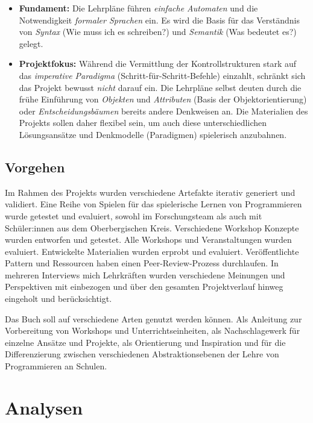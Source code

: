 \documentclass[a5paper,pagesize,10pt,bibtotoc,pointlessnumbers,
normalheadings,DIV=9,twoside=false]{scrbook}
\begin{document}
\begin{itemize}
    \item \textbf{Fundament:} Die Lehrpläne führen \textit{einfache Automaten} und die Notwendigkeit \textit{formaler Sprachen} ein. Es wird die Basis für das Verständnis von \textit{Syntax} (Wie muss ich es schreiben?) und \textit{Semantik} (Was bedeutet es?) gelegt.
    \item \textbf{Projektfokus:} Während die Vermittlung der Kontrollstrukturen stark auf das \textit{imperative Paradigma} (Schritt-für-Schritt-Befehle) einzahlt, schränkt sich das Projekt bewusst \textit{nicht} darauf ein. Die Lehrpläne selbst deuten durch die frühe Einführung von \textit{Objekten} und \textit{Attributen} (Basis der Objektorientierung) oder \textit{Entscheidungsbäumen} bereits andere Denkweisen an. Die Materialien des Projekts sollen daher flexibel sein, um auch diese unterschiedlichen Lösungsansätze und Denkmodelle (Paradigmen) spielerisch anzubahnen.
\end{itemize}

\section*{Vorgehen}

Im Rahmen des Projekts wurden verschiedene Artefakte iterativ generiert und validiert. Eine Reihe von Spielen für das spielerische Lernen von Programmieren wurde getestet und evaluiert, sowohl im Forschungsteam als auch mit Schüler:innen aus dem Oberbergischen Kreis. Verschiedene Workshop Konzepte wurden entworfen und getestet. Alle Workshops und Veranstaltungen wurden evaluiert. Entwickelte Materialien wurden erprobt und evaluiert. Veröffentlichte Pattern und Ressourcen haben einen Peer-Review-Prozess durchlaufen. In mehreren Interviews mich Lehrkräften wurden verschiedene Meinungen und Perspektiven mit einbezogen und über den gesamten Projektverlauf hinweg eingeholt und berücksichtigt.

Das Buch soll auf verschiedene Arten genutzt werden können. Als Anleitung zur Vorbereitung von Workshops und Unterrichtseinheiten, als Nachschlagewerk für einzelne Ansätze und Projekte, als Orientierung und Inspiration und für die Differenzierung zwischen verschiedenen Abstraktionsebenen der Lehre von Programmieren an Schulen.

\chapter{Analysen}
\end{document}
